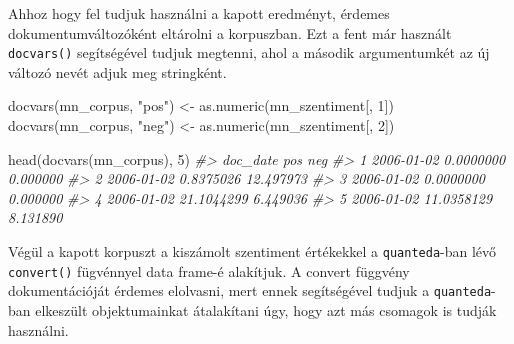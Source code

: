 \documentclass[
]{book}
\newenvironment{Shaded}{\begin{snugshade}}{\end{snugshade}}
\newcommand{\CommentTok}[1]{\textcolor[rgb]{0.56,0.35,0.01}{\textit{#1}}}
\newcommand{\DecValTok}[1]{\textcolor[rgb]{0.00,0.00,0.81}{#1}}
\newcommand{\FunctionTok}[1]{\textcolor[rgb]{0.00,0.00,0.00}{#1}}
\newcommand{\NormalTok}[1]{#1}
\newcommand{\OtherTok}[1]{\textcolor[rgb]{0.56,0.35,0.01}{#1}}
\newcommand{\StringTok}[1]{\textcolor[rgb]{0.31,0.60,0.02}{#1}}
\begin{document}
Ahhoz hogy fel tudjuk használni a kapott eredményt, érdemes
dokumentumváltozóként eltárolni a korpuszban. Ezt a fent már használt
\texttt{docvars()} segítségével tudjuk megtenni, ahol a második
argumentumkét az új változó nevét adjuk meg stringként.

\begin{Shaded}
\begin{Highlighting}[]

\FunctionTok{docvars}\NormalTok{(mn\_corpus, }\StringTok{"pos"}\NormalTok{) }\OtherTok{\textless{}{-}} \FunctionTok{as.numeric}\NormalTok{(mn\_szentiment[, }\DecValTok{1}\NormalTok{])}
\FunctionTok{docvars}\NormalTok{(mn\_corpus, }\StringTok{"neg"}\NormalTok{) }\OtherTok{\textless{}{-}} \FunctionTok{as.numeric}\NormalTok{(mn\_szentiment[, }\DecValTok{2}\NormalTok{])}

\FunctionTok{head}\NormalTok{(}\FunctionTok{docvars}\NormalTok{(mn\_corpus), }\DecValTok{5}\NormalTok{)}
\CommentTok{\#\textgreater{}     doc\_date        pos       neg}
\CommentTok{\#\textgreater{} 1 2006{-}01{-}02  0.0000000  0.000000}
\CommentTok{\#\textgreater{} 2 2006{-}01{-}02  0.8375026 12.497973}
\CommentTok{\#\textgreater{} 3 2006{-}01{-}02  0.0000000  0.000000}
\CommentTok{\#\textgreater{} 4 2006{-}01{-}02 21.1044299  6.449036}
\CommentTok{\#\textgreater{} 5 2006{-}01{-}02 11.0358129  8.131890}
\end{Highlighting}
\end{Shaded}

Végül a kapott korpuszt a kiszámolt szentiment értékekkel a
\texttt{quanteda}-ban lévő \texttt{convert()} fügvénnyel data frame-é
alakítjuk. A convert függvény dokumentációját érdemes elolvasni, mert
ennek segítségével tudjuk a \texttt{quanteda}-ban elkeszült
objektumainkat átalakítani úgy, hogy azt más csomagok is tudják
használni.
\end{document}

